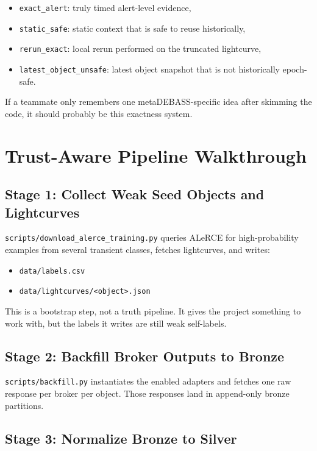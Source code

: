 \documentclass[11pt]{article}
\newcommand{\code}[1]{\texttt{#1}}
\begin{document}
\begin{itemize}
\item \code{exact\_alert}: truly timed alert-level evidence,
\item \code{static\_safe}: static context that is safe to reuse historically,
\item \code{rerun\_exact}: local rerun performed on the truncated lightcurve,
\item \code{latest\_object\_unsafe}: latest object snapshot that is not historically epoch-safe.
\end{itemize}

If a teammate only remembers one metaDEBASS-specific idea after skimming the code, it should probably be this exactness system.

\section{Trust-Aware Pipeline Walkthrough}

\subsection{Stage 1: Collect Weak Seed Objects and Lightcurves}

\code{scripts/download\_alerce\_training.py} queries ALeRCE for high-probability examples from several transient classes, fetches lightcurves, and writes:

\begin{itemize}
\item \code{data/labels.csv}
\item \code{data/lightcurves/<object>.json}
\end{itemize}

This is a bootstrap step, not a truth pipeline. It gives the project something to work with, but the labels it writes are still weak self-labels.

\subsection{Stage 2: Backfill Broker Outputs to Bronze}

\code{scripts/backfill.py} instantiates the enabled adapters and fetches one raw response per broker per object. Those responses land in append-only bronze partitions.

\subsection{Stage 3: Normalize Bronze to Silver}
\end{document}
